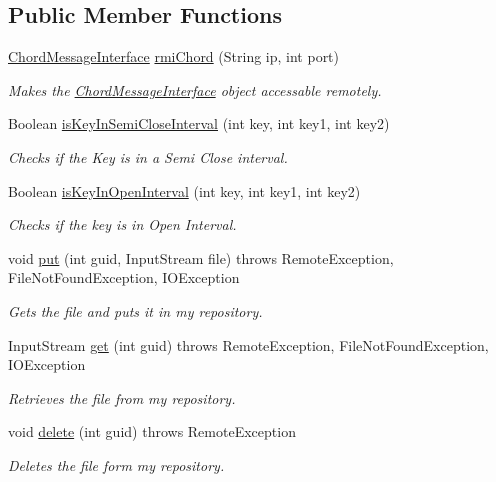 \subsection*{Public Member Functions}
\begin{DoxyCompactItemize}
\item 
\hyperlink{interface_chord_message_interface}{Chord\+Message\+Interface} \hyperlink{class_chord_a2fd46745a549fb8447f2cb7e32e8b07b}{rmi\+Chord} (String ip, int port)
\begin{DoxyCompactList}\small\item\em Makes the \hyperlink{interface_chord_message_interface}{Chord\+Message\+Interface} object accessable remotely. \end{DoxyCompactList}\item 
Boolean \hyperlink{class_chord_ad88edc3a01395c31dd0ae209195a2e08}{is\+Key\+In\+Semi\+Close\+Interval} (int key, int key1, int key2)
\begin{DoxyCompactList}\small\item\em Checks if the Key is in a Semi Close interval. \end{DoxyCompactList}\item 
Boolean \hyperlink{class_chord_a711a8c4e621940da4c48c1ba60479bd7}{is\+Key\+In\+Open\+Interval} (int key, int key1, int key2)
\begin{DoxyCompactList}\small\item\em Checks if the key is in Open Interval. \end{DoxyCompactList}\item 
void \hyperlink{class_chord_a88829ad2bea7d036256fd55dab5945fd}{put} (int guid, Input\+Stream file)  throws Remote\+Exception, File\+Not\+Found\+Exception, I\+O\+Exception 
\begin{DoxyCompactList}\small\item\em Gets the file and puts it in my repository. \end{DoxyCompactList}\item 
Input\+Stream \hyperlink{class_chord_a0425685114bc996226e87f417221c213}{get} (int guid)  throws Remote\+Exception, File\+Not\+Found\+Exception, I\+O\+Exception 
\begin{DoxyCompactList}\small\item\em Retrieves the file from my repository. \end{DoxyCompactList}\item 
void \hyperlink{class_chord_a83d9245c283baf440dc847cee154c8c6}{delete} (int guid)  throws Remote\+Exception 
\begin{DoxyCompactList}\small\item\em Deletes the file form my repository. \end{DoxyCompactList}\item 

\end{DoxyCompactItemize}
